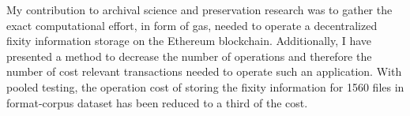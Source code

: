 \documentclass[final]{vutinfth}
\begin{document}
My contribution to archival science and preservation research was to gather the exact computational effort, in form of gas, needed to operate a decentralized fixity information storage on the Ethereum blockchain. Additionally, I have presented a method to decrease the number of operations and therefore the number of cost relevant transactions needed to operate such an application. With pooled testing, the operation cost of storing the fixity information for 1560 files in format-corpus dataset has been reduced to a third of the cost.
 




\backmatter

\listoffigures 

\listoftables 



\printindex
\printnoidxglossaries
\glsaddall


\end{document}
